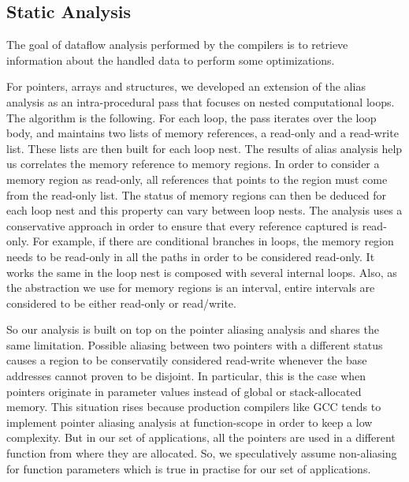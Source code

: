 \documentclass[sigconf]{acmart}
\begin{document}
\subsection{Static Analysis}

The goal of dataflow analysis performed by the compilers is to retrieve information about the handled data to perform some optimizations.

For pointers, arrays and structures, we developed an extension of the alias analysis as an intra-procedural pass that focuses on nested computational loops. The algorithm is the following. For each loop, the pass iterates over the loop body, and maintains two lists of memory references, a read-only and a read-write list. These lists are then built for each loop nest. The results of alias analysis help us correlates the memory reference to memory regions. In order to consider a memory region as read-only, all references that points to the region must come from the read-only list. The status of memory regions can then be deduced for each loop nest and this property can vary between loop nests. The analysis uses a conservative approach in order to ensure that every reference captured is read-only. For example, if there are conditional branches in loops, the memory region needs to be read-only in all the paths in order to be considered read-only. It works the same in the loop nest is composed with several internal loops. Also, as the abstraction we use for memory regions is an interval, entire intervals are considered to be either read-only or read/write. 

So our analysis is built on top on the pointer aliasing analysis and shares the same limitation. Possible aliasing between two pointers with a different status causes a region to be conservatily considered read-write whenever the base addresses cannot proven to be disjoint. In particular, this is the case when pointers originate in parameter values instead of global or stack-allocated memory. This situation rises because production compilers like GCC tends to implement pointer aliasing analysis at function-scope in order to keep a low complexity. But in our set of applications, all the pointers are used in a different function from where they are allocated. So, we speculatively assume non-aliasing for function parameters which is true in practise for our set of applications.

\end{document}
